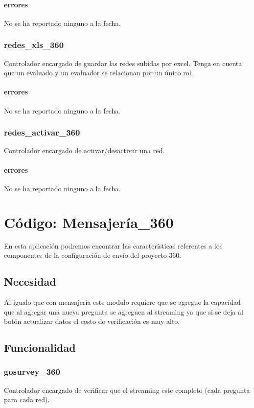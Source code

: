 \documentclass[10pt,a4paper]{book}
\begin{document}
	\subsubsection{errores}
	No se ha reportado ninguno a la fecha.
	
	\subsection{redes\_xls\_360}
	Controlador encargado de guardar las redes subidas por excel. Tenga en cuenta que un evaluado y un evaluador se relacionan por un único rol.
	\subsubsection{errores}
	No se ha reportado ninguno a la fecha.
	
	\subsection{redes\_activar\_360}
	Controlador encargado de activar/desactivar una red.
	\subsubsection{errores}
	No se ha reportado ninguno a la fecha.


	\chapter{Código: Mensajería\_360}
	
	En esta aplicación podremos encontrar las características referentes a los componentes de la configuración de envío del proyecto 360.
	
	\section{Necesidad}
	Al igualo que con mensajería este modulo requiere que se agregue la capacidad que al agregar una nueva pregunta se agreguen al streaming ya que si se deja al botón actualizar datos el costo de verificación es muy alto.
	
	\section{Funcionalidad}


	\subsection{gosurvey\_360}
	Controlador encargado de verificar que el streaming este completo (cada pregunta para cada red).
\end{document}
